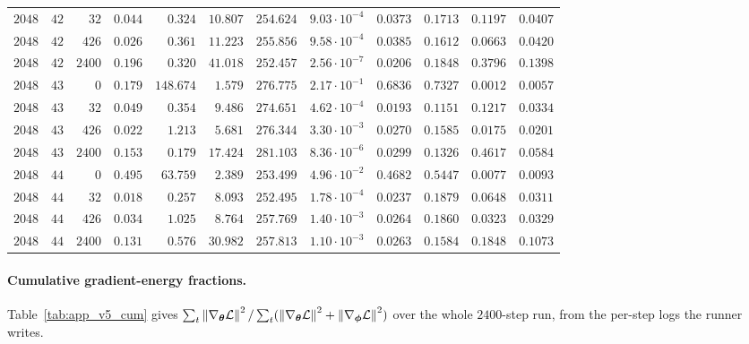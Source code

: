 \begin{table}[htbp]
\begin{tabular}{rrrrrrrrrrrr}
$2048$ & $42$ & $32$   & $0.044$ & $0.324$   & $10.807$ & $254.624$ & $9.03\cdot10^{-4}$ & $0.0373$ & $0.1713$ & $0.1197$ & $0.0407$ \\
$2048$ & $42$ & $426$  & $0.026$ & $0.361$   & $11.223$ & $255.856$ & $9.58\cdot10^{-4}$ & $0.0385$ & $0.1612$ & $0.0663$ & $0.0420$ \\
$2048$ & $42$ & $2400$ & $0.196$ & $0.320$   & $41.018$ & $252.457$ & $2.56\cdot10^{-7}$ & $0.0206$ & $0.1848$ & $0.3796$ & $0.1398$ \\
$2048$ & $43$ & $0$    & $0.179$ & $148.674$ & $1.579$  & $276.775$ & $2.17\cdot10^{-1}$ & $0.6836$ & $0.7327$ & $0.0012$ & $0.0057$ \\
$2048$ & $43$ & $32$   & $0.049$ & $0.354$   & $9.486$  & $274.651$ & $4.62\cdot10^{-4}$ & $0.0193$ & $0.1151$ & $0.1217$ & $0.0334$ \\
$2048$ & $43$ & $426$  & $0.022$ & $1.213$   & $5.681$  & $276.344$ & $3.30\cdot10^{-3}$ & $0.0270$ & $0.1585$ & $0.0175$ & $0.0201$ \\
$2048$ & $43$ & $2400$ & $0.153$ & $0.179$   & $17.424$ & $281.103$ & $8.36\cdot10^{-6}$ & $0.0299$ & $0.1326$ & $0.4617$ & $0.0584$ \\
$2048$ & $44$ & $0$    & $0.495$ & $63.759$  & $2.389$  & $253.499$ & $4.96\cdot10^{-2}$ & $0.4682$ & $0.5447$ & $0.0077$ & $0.0093$ \\
$2048$ & $44$ & $32$   & $0.018$ & $0.257$   & $8.093$  & $252.495$ & $1.78\cdot10^{-4}$ & $0.0237$ & $0.1879$ & $0.0648$ & $0.0311$ \\
$2048$ & $44$ & $426$  & $0.034$ & $1.025$   & $8.764$  & $257.769$ & $1.40\cdot10^{-3}$ & $0.0264$ & $0.1860$ & $0.0323$ & $0.0329$ \\
$2048$ & $44$ & $2400$ & $0.131$ & $0.576$   & $30.982$ & $257.813$ & $1.10\cdot10^{-3}$ & $0.0263$ & $0.1584$ & $0.1848$ & $0.1073$ \\
\bottomrule
\end{tabular}
\end{table}

\paragraph{Cumulative gradient-energy fractions.} Table~\ref{tab:app_v5_cum}
gives $\sum_t \left\lVert\nabla_{\boldsymbol{\theta}}\mathcal{L}\right\rVert^2 / \sum_t (\left\lVert\nabla_{\boldsymbol{\theta}}
\mathcal{L}\right\rVert^2 + \left\lVert\nabla_{\boldsymbol{\phi}}\mathcal{L}\right\rVert^2)$ over the whole $2400$-step run, from
the per-step logs the runner writes.

